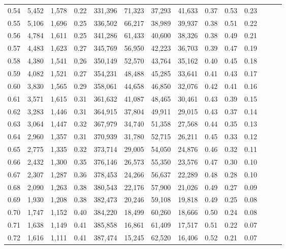 \begin{tabular}{rrrrrrrrrrrrrr}
0.54 &  5,452 &  1,578 &  0.22 &  331,396 &   71,323 &  37,293 &  41,633 &  0.37 &  0.53 &      0.23 \\
0.55 &  5,106 &  1,696 &  0.25 &  336,502 &   66,217 &  38,989 &  39,937 &  0.38 &  0.51 &      0.22 \\
0.56 &  4,784 &  1,611 &  0.25 &  341,286 &   61,433 &  40,600 &  38,326 &  0.38 &  0.49 &      0.21 \\
0.57 &  4,483 &  1,623 &  0.27 &  345,769 &   56,950 &  42,223 &  36,703 &  0.39 &  0.47 &      0.19 \\
0.58 &  4,380 &  1,541 &  0.26 &  350,149 &   52,570 &  43,764 &  35,162 &  0.40 &  0.45 &      0.18 \\
0.59 &  4,082 &  1,521 &  0.27 &  354,231 &   48,488 &  45,285 &  33,641 &  0.41 &  0.43 &      0.17 \\
0.60 &  3,830 &  1,565 &  0.29 &  358,061 &   44,658 &  46,850 &  32,076 &  0.42 &  0.41 &      0.16 \\
0.61 &  3,571 &  1,615 &  0.31 &  361,632 &   41,087 &  48,465 &  30,461 &  0.43 &  0.39 &      0.15 \\
0.62 &  3,283 &  1,446 &  0.31 &  364,915 &   37,804 &  49,911 &  29,015 &  0.43 &  0.37 &      0.14 \\
0.63 &  3,064 &  1,447 &  0.32 &  367,979 &   34,740 &  51,358 &  27,568 &  0.44 &  0.35 &      0.13 \\
0.64 &  2,960 &  1,357 &  0.31 &  370,939 &   31,780 &  52,715 &  26,211 &  0.45 &  0.33 &      0.12 \\
0.65 &  2,775 &  1,335 &  0.32 &  373,714 &   29,005 &  54,050 &  24,876 &  0.46 &  0.32 &      0.11 \\
0.66 &  2,432 &  1,300 &  0.35 &  376,146 &   26,573 &  55,350 &  23,576 &  0.47 &  0.30 &      0.10 \\
0.67 &  2,307 &  1,287 &  0.36 &  378,453 &   24,266 &  56,637 &  22,289 &  0.48 &  0.28 &      0.10 \\
0.68 &  2,090 &  1,263 &  0.38 &  380,543 &   22,176 &  57,900 &  21,026 &  0.49 &  0.27 &      0.09 \\
0.69 &  1,930 &  1,208 &  0.38 &  382,473 &   20,246 &  59,108 &  19,818 &  0.49 &  0.25 &      0.08 \\
0.70 &  1,747 &  1,152 &  0.40 &  384,220 &   18,499 &  60,260 &  18,666 &  0.50 &  0.24 &      0.08 \\
0.71 &  1,638 &  1,149 &  0.41 &  385,858 &   16,861 &  61,409 &  17,517 &  0.51 &  0.22 &      0.07 \\
0.72 &  1,616 &  1,111 &  0.41 &  387,474 &   15,245 &  62,520 &  16,406 &  0.52 &  0.21 &      0.07 \\

\end{tabular}
